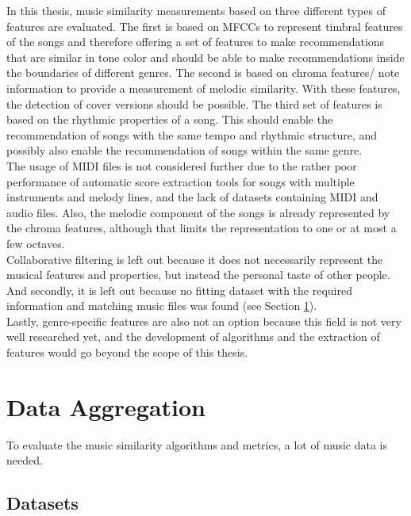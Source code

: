 In this thesis, music similarity measurements based on three different types of features are evaluated. The first is based on MFCCs to represent timbral features of the songs and therefore offering a set of features to make recommendations that are similar in tone color and should be able to make recommendations inside the boundaries of different genres. The second is based on chroma features/ note information to provide a measurement of melodic similarity. With these features, the detection of cover versions should be possible. The third set of features is based on the rhythmic properties of a song. This should enable the recommendation of songs with the same tempo and rhythmic structure, and possibly also enable the recommendation of songs within the same genre.\\
The usage of MIDI files is not considered further due to the rather poor performance of automatic score extraction tools for songs with multiple instruments and melody lines, and the lack of datasets containing MIDI and audio files. Also, the melodic component of the songs is already represented by the chroma features, although that limits the representation to one or at most a few octaves.\\
Collaborative filtering is left out because it does not necessarily represent the musical features and properties, but instead the personal taste of other people. And secondly, it is left out because no fitting dataset with the required information and matching music files was found (see Section \ref{data}).\\
Lastly, genre-specific features are also not an option because this field is not very well researched yet, and the development of algorithms and the extraction of features would go beyond the scope of this thesis.

\section{Data Aggregation}\label{data}

To evaluate the music similarity algorithms and metrics, a lot of music data is needed.

\subsection{Datasets}\label{datasets}

